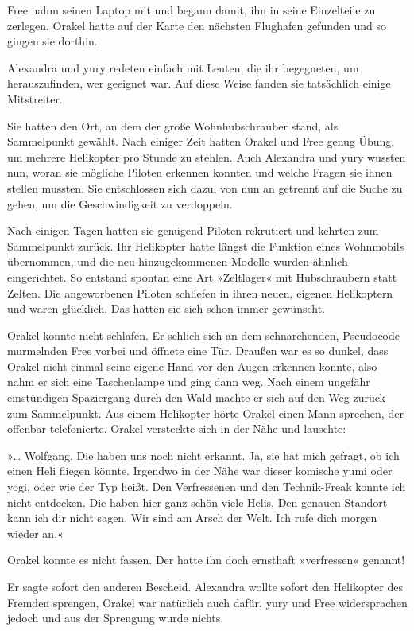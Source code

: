 Free nahm seinen Laptop mit und begann damit, ihn in seine Einzelteile zu zerlegen. Orakel hatte auf der Karte den nächsten Flughafen gefunden und so gingen sie dorthin.

Alexandra und yury redeten einfach mit Leuten, die ihr begegneten, um herauszufinden, wer geeignet war. Auf diese Weise fanden sie tatsächlich einige Mitstreiter.

Sie hatten den Ort, an dem der große Wohnhubschrauber stand, als Sammelpunkt gewählt. Nach einiger Zeit hatten Orakel und Free genug Übung, um mehrere Helikopter pro Stunde zu stehlen. Auch Alexandra und yury wussten nun, woran sie mögliche Piloten erkennen konnten und welche Fragen sie ihnen stellen mussten. Sie entschlossen sich dazu, von nun an getrennt auf die Suche zu gehen, um die Geschwindigkeit zu verdoppeln.

Nach einigen Tagen hatten sie genügend Piloten rekrutiert und kehrten zum Sammelpunkt zurück. Ihr Helikopter hatte längst die Funktion eines Wohnmobils übernommen, und die neu hinzugekommenen Modelle wurden ähnlich eingerichtet. So entstand spontan eine Art »Zeltlager« mit Hubschraubern statt Zelten. Die angeworbenen Piloten schliefen in ihren neuen, eigenen Helikoptern und waren glücklich. Das hatten sie sich schon immer gewünscht.

Orakel konnte nicht schlafen. Er schlich sich an dem schnarchenden, Pseudocode murmelnden Free vorbei und öffnete eine Tür. Draußen war es so dunkel, dass Orakel nicht einmal seine eigene Hand vor den Augen erkennen konnte, also nahm er sich eine Taschenlampe und ging dann weg. Nach einem ungefähr einstündigen Spaziergang durch den Wald machte er sich auf den Weg zurück zum Sammelpunkt. Aus einem Helikopter hörte Orakel einen Mann sprechen, der offenbar telefonierte. Orakel versteckte sich in der Nähe und lauschte:

»… Wolfgang. Die haben uns noch nicht erkannt. Ja, sie hat mich gefragt, ob ich einen Heli fliegen könnte. Irgendwo in der Nähe war dieser komische yumi oder yogi, oder wie der Typ heißt. Den Verfressenen und den Technik-Freak konnte ich nicht entdecken. Die haben hier ganz schön viele Helis. Den genauen Standort kann ich dir nicht sagen. Wir sind am Arsch der Welt. Ich rufe dich morgen wieder an.«

Orakel konnte es nicht fassen. Der hatte ihn doch ernsthaft »verfressen« genannt!

Er sagte sofort den anderen Bescheid. Alexandra wollte sofort den Helikopter des Fremden sprengen, Orakel war natürlich auch dafür, yury und Free widersprachen jedoch und aus der Sprengung wurde nichts.


